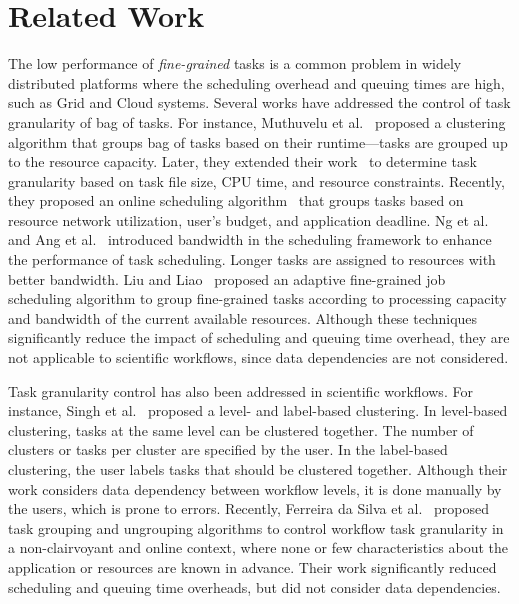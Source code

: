 \documentclass[final]{IEEEtran}
\begin{document}
\section{Related Work}

The low performance of \emph{fine-grained} tasks is a common problem in widely distributed platforms where the scheduling overhead and queuing times are high, such as Grid and Cloud systems. Several works have addressed the control of task granularity of bag of tasks. For instance, Muthuvelu et al.~\cite{Muthuvelu:2005:DJG:1082290.1082297} proposed a clustering algorithm that groups bag of tasks based on their runtime---tasks are grouped up to the resource capacity. Later, they extended their work~\cite{4493929} to determine task granularity based on task file size, CPU time, and resource constraints. Recently, they proposed an online scheduling algorithm~\cite{Muthuvelu2010,Muthuvelu2013170} that groups tasks based on resource network utilization, user's budget, and application deadline. Ng et al.~\cite{keat-2006} and Ang et al.~\cite{ang-2009} introduced bandwidth in the scheduling framework to enhance the performance of task scheduling. Longer tasks are assigned to resources with better bandwidth. Liu and Liao~\cite{4958835} proposed an adaptive fine-grained job scheduling algorithm to group fine-grained tasks according to processing capacity and bandwidth of the current available resources. Although these techniques significantly reduce the impact of scheduling and queuing time overhead, they are not applicable to scientific workflows, since data dependencies are not considered.

Task granularity control has also been addressed in scientific workflows. For instance, Singh et al.~\cite{Singh:2008:WTC:1341811.1341822} proposed a level- and label-based clustering. In level-based clustering, tasks at the same level can be clustered together. The number of clusters or tasks per cluster are specified by the user. In the label-based clustering, the user labels tasks that should be clustered together. Although their work considers data dependency between workflow levels, it is done manually by the users, which is prone to errors. Recently, Ferreira da Silva et al.~\cite{europar-granularity} proposed task grouping and ungrouping algorithms to control workflow task granularity in a non-clairvoyant and online context, where none or few characteristics about the application or resources are known in advance. Their work significantly reduced scheduling and queuing time overheads, but did not consider data dependencies.
\end{document}

